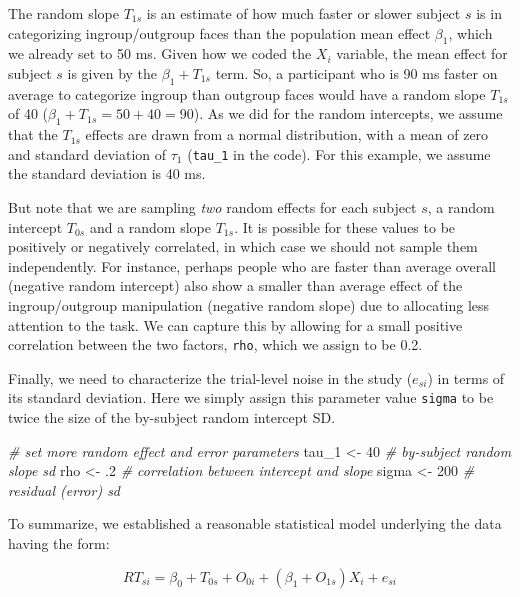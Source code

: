 \documentclass[
  english,
  doc,floatsintext]{apa6}
\newenvironment{Shaded}{\begin{snugshade}}{\end{snugshade}}
\newcommand{\CommentTok}[1]{\textcolor[rgb]{0.56,0.35,0.01}{\textit{#1}}}
\newcommand{\DecValTok}[1]{\textcolor[rgb]{0.00,0.00,0.81}{#1}}
\newcommand{\FloatTok}[1]{\textcolor[rgb]{0.00,0.00,0.81}{#1}}
\newcommand{\NormalTok}[1]{#1}
\newcommand{\StringTok}[1]{\textcolor[rgb]{0.31,0.60,0.02}{#1}}
\begin{document}
The random slope \(T_{1s}\) is an estimate of how much faster or slower subject \(s\) is in categorizing ingroup/outgroup faces than the population mean effect \(\beta_1\), which we already set to 50 ms. Given how we coded the \(X_i\) variable, the mean effect for subject \(s\) is given by the \(\beta_1 + T_{1s}\) term. So, a participant who is 90 ms faster on average to categorize ingroup than outgroup faces would have a random slope \(T_{1s}\) of 40 (\(\beta_1 + T_{1s} = 50 + 40 = 90\)). As we did for the random intercepts, we assume that the \(T_{1s}\) effects are drawn from a normal distribution, with a mean of zero and standard deviation of \(\tau_1\) (\texttt{tau\_1} in the code). For this example, we assume the standard deviation is 40 ms.

But note that we are sampling \emph{two} random effects for each subject \(s\), a random intercept \(T_{0s}\) and a random slope \(T_{1s}\). It is possible for these values to be positively or negatively correlated, in which case we should not sample them independently. For instance, perhaps people who are faster than average overall (negative random intercept) also show a smaller than average effect of the ingroup/outgroup manipulation (negative random slope) due to allocating less attention to the task. We can capture this by allowing for a small positive correlation between the two factors, \texttt{rho}, which we assign to be 0.2.

Finally, we need to characterize the trial-level noise in the study (\(e_{si}\)) in terms of its standard deviation. Here we simply assign this parameter value \texttt{sigma} to be twice the size of the by-subject random intercept SD.

\begin{Shaded}
\begin{Highlighting}[]
\CommentTok{# set more random effect and error parameters}
\NormalTok{tau_}\DecValTok{1}\NormalTok{  <-}\StringTok{  }\DecValTok{40} \CommentTok{# by-subject random slope sd}
\NormalTok{rho    <-}\StringTok{  }\FloatTok{.2} \CommentTok{# correlation between intercept and slope}
\NormalTok{sigma  <-}\StringTok{ }\DecValTok{200} \CommentTok{# residual (error) sd}
\end{Highlighting}
\end{Shaded}

To summarize, we established a reasonable statistical model underlying the data having the form:

\begin{equation}
RT_{si} = \beta_0 + T_{0s} + O_{0i} + \left(\beta_1 + O_{1s}\right) X_i + e_{si}
\end{equation}
\end{document}
